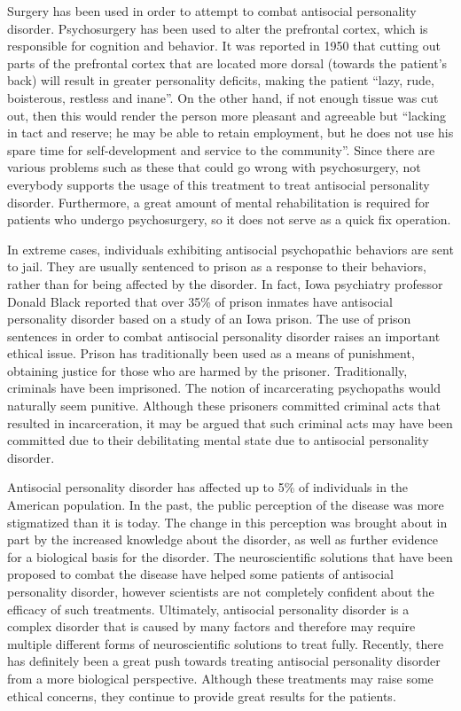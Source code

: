 Surgery has been used in order to attempt to combat antisocial personality disorder. Psychosurgery has been used to alter the prefrontal cortex, which is responsible for cognition and behavior. It was reported in 1950 that cutting out parts of the prefrontal cortex that are located more dorsal (towards the patient's back) will result in greater personality deficits, making the patient “lazy, rude, boisterous, restless and inane”. \cite{freeman}On the other hand, if not enough tissue was cut out, then this would render the person more pleasant and agreeable but “lacking in tact and reserve; he may be able to retain employment, but he does not use his spare time for self-development and service to the community”. \cite{freeman}Since there are various problems such as these that could go wrong with psychosurgery, not everybody supports the usage of this treatment to treat antisocial personality disorder. Furthermore, a great amount of mental rehabilitation is required for patients who undergo psychosurgery, so it does not serve as a quick fix operation.
	
In extreme cases, individuals exhibiting antisocial psychopathic behaviors are sent to jail. They are usually sentenced to prison as a response to their behaviors, rather than for being affected by the disorder. In fact, Iowa psychiatry professor Donald Black reported that over 35\% of prison inmates have antisocial personality disorder based on a study of an Iowa prison. \cite{black} The use of prison sentences in order to combat antisocial personality disorder raises an important ethical issue. Prison has traditionally been used as a means of punishment, obtaining justice for those who are harmed by the prisoner.  Traditionally, criminals have been imprisoned. The notion of incarcerating psychopaths would naturally seem punitive. Although these prisoners committed criminal acts that resulted in incarceration, it may be argued that such criminal acts may have been committed due to their debilitating mental state due to antisocial personality disorder.
	
Antisocial personality disorder has affected up to 5\% of individuals in the American population. In the past, the public perception of the disease was more stigmatized than it is today. The change in this perception was brought about in part by the increased knowledge about the disorder, as well as further evidence for a biological basis for the disorder.  The neuroscientific solutions that have been proposed to combat the disease have helped some patients of antisocial personality disorder, however scientists are not completely confident about the efficacy of such treatments.  Ultimately, antisocial personality disorder is a complex disorder that is caused by many factors and therefore may require multiple different forms of neuroscientific solutions to treat fully. Recently, there has definitely been a great push towards treating antisocial personality disorder from a more biological perspective. Although these treatments may raise some ethical concerns, they continue to provide great results for the patients.


